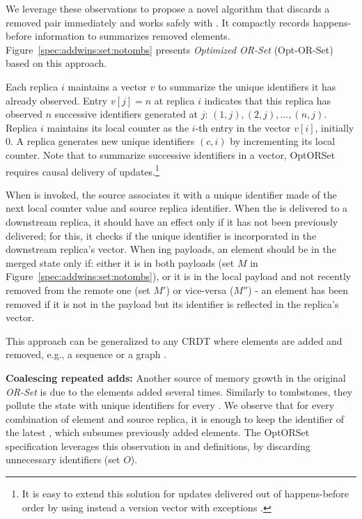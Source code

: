 \documentclass[a4paper]{article}
\begin{document}
We leverage these observations to propose a novel \remove algorithm that
discards a removed pair immediately and works safely with \merge.  It
compactly records happens-before information to summarizes removed
elements.  Figure~\ref{spec:addwins:set:notombs} presents \emph{Optimized OR-Set}
(Opt-OR-Set) based on this approach.

Each replica $i$ maintains a vector $v$ \cite{Parker83Detection} to
summarize the unique identifiers it has already observed.  Entry $v[j] = n$
at replica $i$ indicates that this replica has observed $n$ successive
identifiers generated at $j$: $(1,j),(2,j),\ldots,(n,j)$.  Replica $i$
maintains its local counter as the $i$-th entry in the vector $v[i]$,
initially $0$.  A replica generates new unique identifiers $(c,i)$ by
incrementing its local counter.  Note that to summarize successive
identifiers in a  vector, OptORSet requires causal delivery of
updates.\footnote{ It is easy to extend this solution for updates delivered
out of happens-before order by using instead a version vector with
exceptions \cite{DBLP:journals/dc/MalkhiT07}.}

When \add is invoked, the source associates it with a unique identifier made
of the next local counter value and source replica identifier.  When the
\add is delivered to a downstream replica, it should have an effect only if
it has not been previously delivered; for this, it checks if the unique
identifier is incorporated in the downstream replica's vector.  When
\merge{}ing payloads, an element should be in the merged state only if:
either it is in both payloads (set $M$ in
Figure~\ref{spec:addwins:set:notombs}), or it is in the local payload and
not recently removed from the remote one (set $M'$) or vice-versa ($M''$) -
an element has been removed if it is not in the payload but its identifier
is reflected in the replica's vector.

This approach can be generalized to any CRDT where elements are added
and removed, e.g., a sequence \cite{alg:rep:sh131,app:rep:1652} or a
graph \cite{syn:sh144}.



{\bf Coalescing repeated adds:} Another source of memory growth in the
original \emph{OR-Set} is due to the elements added several times.  Similarly to
tombstones, they pollute the state with unique identifiers for every \add{}.
We observe that for every combination of element and source replica, it is
enough to keep the identifier of the latest \add, which subsumes previously
added elements.  The OptORSet specification leverages this observation in
\add{} and \merge{} definitions, by discarding unnecessary identifiers (set
$O$).
\end{document}
